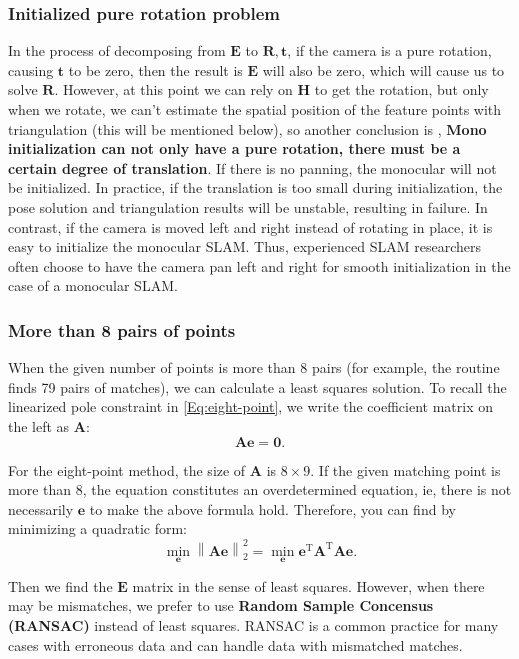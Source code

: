 \subsubsection{Initialized pure rotation problem}
In the process of decomposing from $\bm{E}$ to $\bm{R}, \bm{t}$, if the camera is a pure rotation, causing $\bm{t}$ to be zero, then the result is $\bm{E}$ will also be zero, which will cause us to solve $\bm{R}$. However, at this point we can rely on $\bm{H}$ to get the rotation, but only when we rotate, we can't estimate the spatial position of the feature points with triangulation (this will be mentioned below), so another conclusion is , \textbf {Mono initialization can not only have a pure rotation, there must be a certain degree of translation}. If there is no panning, the monocular will not be initialized. In practice, if the translation is too small during initialization, the pose solution and triangulation results will be unstable, resulting in failure. In contrast, if the camera is moved left and right instead of rotating in place, it is easy to initialize the monocular SLAM. Thus, experienced SLAM researchers often choose to have the camera pan left and right for smooth initialization in the case of a monocular SLAM.

\subsubsection{More than 8 pairs of points}
When the given number of points is more than 8 pairs (for example, the routine finds 79 pairs of matches), we can calculate a least squares solution. To recall the linearized pole constraint in \eqref{Eq:eight-point}, we write the coefficient matrix on the left as $\bm{A}$:
\begin{equation}
\bm{A} \bm{e} = \bm{0} .
\end{equation}

For the eight-point method, the size of $\bm{A}$ is $8 \times 9$. If the given matching point is more than $8$, the equation constitutes an overdetermined equation, ie, there is not necessarily $\bm{e}$ to make the above formula hold. Therefore, you can find by minimizing a quadratic form:
\begin{equation}
\mathop {\min }\limits_{\bm{e}} \left\| \bm{Ae} \right\|_2^2 = \mathop {\min }\limits_{\bm{e}} { \bm {e}^\mathrm{T}} {\bm{A}^\mathrm{T}} \bm{Ae}.
\end{equation}

Then we find the $\bm{E}$ matrix in the sense of least squares. However, when there may be mismatches, we prefer to use \textbf{Random Sample Concensus (RANSAC)} instead of least squares. RANSAC is a common practice for many cases with erroneous data and can handle data with mismatched matches.

